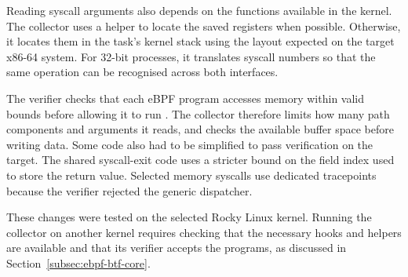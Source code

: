 Reading syscall arguments also depends on the functions available in
the kernel. The collector uses a helper to locate the saved registers
when possible. Otherwise, it locates them in the task's kernel stack
using the layout expected on the target x86-64 system. For 32-bit
processes, it translates syscall numbers so that the same operation
can be recognised across both interfaces.

The verifier checks that each eBPF program accesses memory within valid
bounds before allowing it to run \cite{linux2026ebpfverifier}. The
collector therefore limits how many path components and arguments it
reads, and checks the available buffer space before writing data.
Some code also had to be simplified to pass verification on the target.
The shared syscall-exit code uses a stricter bound on the field index
used to store the return value. Selected memory syscalls use dedicated
tracepoints because the verifier rejected the generic dispatcher.

These changes were tested on the selected Rocky Linux kernel. Running
the collector on another kernel requires checking that the necessary
hooks and helpers are available and that its verifier accepts the
programs, as discussed in Section~\ref{subsec:ebpf-btf-core}.


